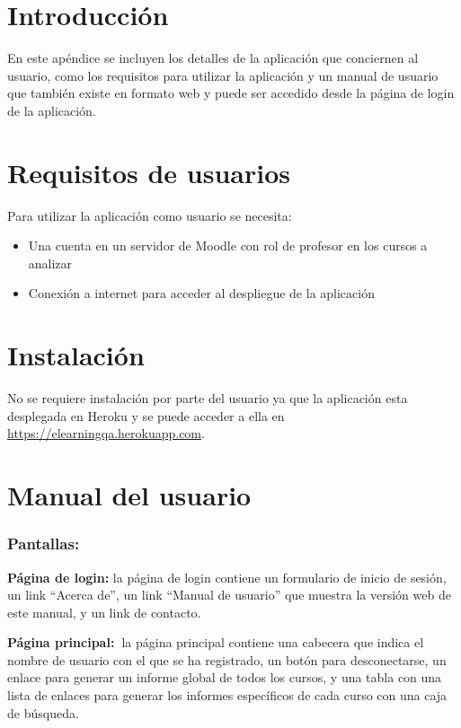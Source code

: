 
\section{Introducción}
En este apéndice se incluyen los detalles de la aplicación que conciernen al usuario, como los requisitos para utilizar la aplicación y un manual de usuario que también existe en formato web y puede ser accedido desde la página de login de la aplicación.
\section{Requisitos de usuarios}
Para utilizar la aplicación como usuario se necesita:
\begin{itemize}
	\item Una cuenta en un servidor de Moodle con rol de profesor en los cursos a analizar
	\item Conexión a internet para acceder al despliegue de la aplicación
\end{itemize}
\section{Instalación}
No se requiere instalación por parte del usuario ya que la aplicación esta desplegada en Heroku y se puede acceder a ella en \url{https://elearningqa.herokuapp.com}.
\section{Manual del usuario}

\subsubsection{Pantallas:}

\textbf{Página de login:} la página de login contiene un formulario de
inicio de sesión, un link ``Acerca de'', un link ``Manual de usuario'' que
muestra la versión web de este manual, y un link de contacto.

\textbf{Página principal:~}la página principal contiene una cabecera que
indica el nombre de usuario con el que se ha registrado, un botón para
desconectarse, un enlace para generar un informe global de todos los
cursos, y una tabla con una lista de enlaces para generar los informes
específicos de cada curso con una caja de búsqueda.

